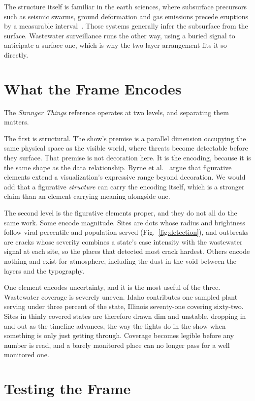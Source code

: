 \documentclass{vgtc}                %
\begin{document}
The structure itself is familiar in the earth sciences, where subsurface
precursors such as seismic swarms, ground deformation and gas emissions precede
eruptions by a measurable interval~\cite{usgs}. Those systems generally infer the
subsurface from the surface. Wastewater surveillance runs the other way, using a
buried signal to anticipate a surface one, which is why the two-layer arrangement
fits it so directly.

\section{What the Frame Encodes}

The \emph{Stranger Things} reference operates at two levels, and separating them
matters.

The first is structural. The show's premise is a parallel dimension occupying the
same physical space as the visible world, where threats become detectable before
they surface. That premise is not decoration here. It is the encoding, because it
is the same shape as the data relationship. Byrne et al.~\cite{byrne2019} argue
that figurative elements extend a visualization's expressive range beyond
decoration. We would add that a figurative \emph{structure} can carry the encoding
itself, which is a stronger claim than an element carrying meaning alongside one.

The second level is the figurative elements proper, and they do not all do the
same work. Some encode magnitude. Sites are dots whose radius and brightness
follow viral percentile and population served (Fig.~\ref{fig:detection}), and
outbreaks are cracks whose severity combines a state's case intensity with the
wastewater signal at each site, so the places that detected most crack hardest.
Others encode nothing and exist for atmosphere, including the dust in the void
between the layers and the typography.

One element encodes uncertainty, and it is the most useful of the three.
Wastewater coverage is severely uneven. Idaho contributes one sampled plant
serving under three percent of the state, Illinois seventy-one covering
sixty-two. Sites in thinly covered states are therefore drawn dim and unstable,
dropping in and out as the timeline advances, the way the lights do in the show
when something is only just getting through. Coverage becomes legible before any
number is read, and a barely monitored place can no longer pass for a well
monitored one.

\section{Testing the Frame}
\end{document}
